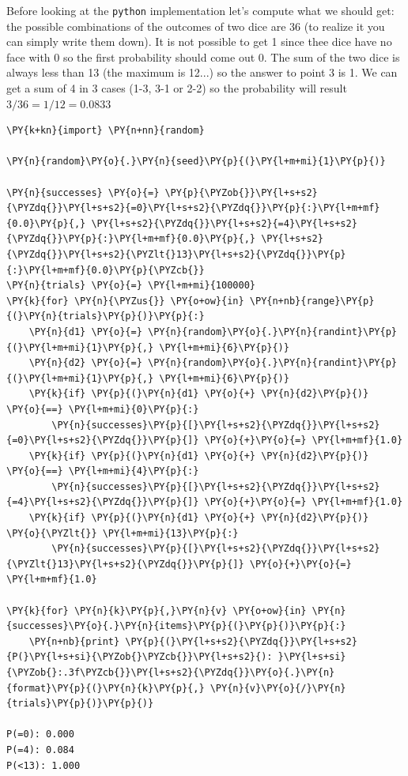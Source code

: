 Before looking at the \texttt{python} implementation let's compute what we should get: the possible combinations
of the outcomes of two dice are 36 (to realize it you can simply write them down). It is not possible to get 1 since
thee dice have no face with 0 so the first probability should come out 0. The sum of the two dice is always less than 13 
(the maximum is 12...) so the answer to point 3 is 1. We can get a sum of 4 in 3 cases (1-3, 3-1 or 2-2) so the 
probability will result $3/36=1/12=0.0833$

\begin{tcolorbox}[breakable, size=fbox, boxrule=1pt, pad at break*=1mm,colback=cellbackground, colframe=cellborder]
\begin{Verbatim}[commandchars=\\\{\}]
\PY{k+kn}{import} \PY{n+nn}{random}

\PY{n}{random}\PY{o}{.}\PY{n}{seed}\PY{p}{(}\PY{l+m+mi}{1}\PY{p}{)}

\PY{n}{successes} \PY{o}{=} \PY{p}{\PYZob{}}\PY{l+s+s2}{\PYZdq{}}\PY{l+s+s2}{=0}\PY{l+s+s2}{\PYZdq{}}\PY{p}{:}\PY{l+m+mf}{0.0}\PY{p}{,} \PY{l+s+s2}{\PYZdq{}}\PY{l+s+s2}{=4}\PY{l+s+s2}{\PYZdq{}}\PY{p}{:}\PY{l+m+mf}{0.0}\PY{p}{,} \PY{l+s+s2}{\PYZdq{}}\PY{l+s+s2}{\PYZlt{}13}\PY{l+s+s2}{\PYZdq{}}\PY{p}{:}\PY{l+m+mf}{0.0}\PY{p}{\PYZcb{}}
\PY{n}{trials} \PY{o}{=} \PY{l+m+mi}{100000}
\PY{k}{for} \PY{n}{\PYZus{}} \PY{o+ow}{in} \PY{n+nb}{range}\PY{p}{(}\PY{n}{trials}\PY{p}{)}\PY{p}{:}
    \PY{n}{d1} \PY{o}{=} \PY{n}{random}\PY{o}{.}\PY{n}{randint}\PY{p}{(}\PY{l+m+mi}{1}\PY{p}{,} \PY{l+m+mi}{6}\PY{p}{)}
    \PY{n}{d2} \PY{o}{=} \PY{n}{random}\PY{o}{.}\PY{n}{randint}\PY{p}{(}\PY{l+m+mi}{1}\PY{p}{,} \PY{l+m+mi}{6}\PY{p}{)}
    \PY{k}{if} \PY{p}{(}\PY{n}{d1} \PY{o}{+} \PY{n}{d2}\PY{p}{)} \PY{o}{==} \PY{l+m+mi}{0}\PY{p}{:}
        \PY{n}{successes}\PY{p}{[}\PY{l+s+s2}{\PYZdq{}}\PY{l+s+s2}{=0}\PY{l+s+s2}{\PYZdq{}}\PY{p}{]} \PY{o}{+}\PY{o}{=} \PY{l+m+mf}{1.0}
    \PY{k}{if} \PY{p}{(}\PY{n}{d1} \PY{o}{+} \PY{n}{d2}\PY{p}{)} \PY{o}{==} \PY{l+m+mi}{4}\PY{p}{:}
        \PY{n}{successes}\PY{p}{[}\PY{l+s+s2}{\PYZdq{}}\PY{l+s+s2}{=4}\PY{l+s+s2}{\PYZdq{}}\PY{p}{]} \PY{o}{+}\PY{o}{=} \PY{l+m+mf}{1.0}
    \PY{k}{if} \PY{p}{(}\PY{n}{d1} \PY{o}{+} \PY{n}{d2}\PY{p}{)} \PY{o}{\PYZlt{}} \PY{l+m+mi}{13}\PY{p}{:}
        \PY{n}{successes}\PY{p}{[}\PY{l+s+s2}{\PYZdq{}}\PY{l+s+s2}{\PYZlt{}13}\PY{l+s+s2}{\PYZdq{}}\PY{p}{]} \PY{o}{+}\PY{o}{=} \PY{l+m+mf}{1.0}
    
\PY{k}{for} \PY{n}{k}\PY{p}{,}\PY{n}{v} \PY{o+ow}{in} \PY{n}{successes}\PY{o}{.}\PY{n}{items}\PY{p}{(}\PY{p}{)}\PY{p}{:}
    \PY{n+nb}{print} \PY{p}{(}\PY{l+s+s2}{\PYZdq{}}\PY{l+s+s2}{P(}\PY{l+s+si}{\PYZob{}\PYZcb{}}\PY{l+s+s2}{): }\PY{l+s+si}{\PYZob{}:.3f\PYZcb{}}\PY{l+s+s2}{\PYZdq{}}\PY{o}{.}\PY{n}{format}\PY{p}{(}\PY{n}{k}\PY{p}{,} \PY{n}{v}\PY{o}{/}\PY{n}{trials}\PY{p}{)}\PY{p}{)}

P(=0): 0.000
P(=4): 0.084
P(<13): 1.000
\end{Verbatim}
\end{tcolorbox}

